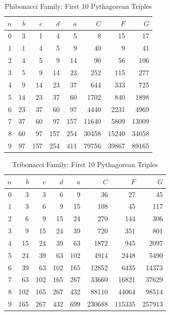 \begin{table}[h!]
\centering
\caption{Phibonacci Family: First 10 Pythagorean Triples}
\label{tab:phibonacci}
\small
\begin{tabular}{rrrrrrrr}
\toprule
$n$ & $b$ & $e$ & $d$ & $a$ & $C$ & $F$ & $G$ \\
\midrule
0 & 3 & 1 & 4 & 5 & 8 & 15 & 17 \\
1 & 1 & 4 & 5 & 9 & 40 & 9 & 41 \\
2 & 4 & 5 & 9 & 14 & 90 & 56 & 106 \\
3 & 5 & 9 & 14 & 23 & 252 & 115 & 277 \\
4 & 9 & 14 & 23 & 37 & 644 & 333 & 725 \\
5 & 14 & 23 & 37 & 60 & 1702 & 840 & 1898 \\
6 & 23 & 37 & 60 & 97 & 4440 & 2231 & 4969 \\
7 & 37 & 60 & 97 & 157 & 11640 & 5809 & 13009 \\
8 & 60 & 97 & 157 & 254 & 30458 & 15240 & 34058 \\
9 & 97 & 157 & 254 & 411 & 79756 & 39867 & 89165 \\
\bottomrule
\end{tabular}
\end{table}


\begin{table}[h!]
\centering
\caption{Tribonacci Family: First 10 Pythagorean Triples}
\label{tab:tribonacci}
\small
\begin{tabular}{rrrrrrrr}
\toprule
$n$ & $b$ & $e$ & $d$ & $a$ & $C$ & $F$ & $G$ \\
\midrule
0 & 3 & 3 & 6 & 9 & 36 & 27 & 45 \\
1 & 3 & 6 & 9 & 15 & 108 & 45 & 117 \\
2 & 6 & 9 & 15 & 24 & 270 & 144 & 306 \\
3 & 9 & 15 & 24 & 39 & 720 & 351 & 801 \\
4 & 15 & 24 & 39 & 63 & 1872 & 945 & 2097 \\
5 & 24 & 39 & 63 & 102 & 4914 & 2448 & 5490 \\
6 & 39 & 63 & 102 & 165 & 12852 & 6435 & 14373 \\
7 & 63 & 102 & 165 & 267 & 33660 & 16821 & 37629 \\
8 & 102 & 165 & 267 & 432 & 88110 & 44064 & 98514 \\
9 & 165 & 267 & 432 & 699 & 230688 & 115335 & 257913 \\
\bottomrule
\end{tabular}
\end{table}


